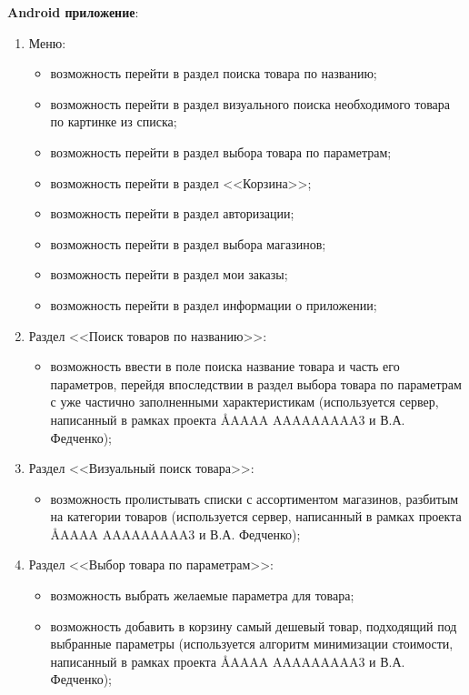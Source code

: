 \documentclass[a4paper,12pt,reqno]{article}
\begin{document}
  \noindent\textbf{Android приложение}:
  \begin{enumerate}
    \item Меню:
    \begin{itemize}
      \item возможность перейти в раздел поиска товара по названию;
      \item возможность перейти в раздел визуального поиска необходимого товара по картинке из списка;
      \item возможность перейти в раздел выбора товара по параметрам;
      \item возможность перейти в раздел <<Корзина>>;
      \item возможность перейти в раздел авторизации;
      \item возможность перейти в раздел выбора магазинов;
      \item возможность перейти в раздел мои заказы;
      \item возможность перейти в раздел информации о приложении;
    \end{itemize}
    \item Раздел <<Поиск товаров по названию>>:
    \begin{itemize}
      \item возможность ввести в поле поиска название товара и часть его параметров, перейдя впоследствии в раздел выбора товара по параметрам с уже частично заполненными характеристикам (используется сервер, написанный в рамках проекта \AA{AAAA AAAAAAAAA}{3} и В.А. Федченко);
    \end{itemize}
    \item Раздел <<Визуальный поиск товара>>:
    \begin{itemize}
      \item возможность пролистывать списки с ассортиментом магазинов, разбитым на категории товаров (используется сервер, написанный в рамках проекта \AA{AAAA AAAAAAAAA}{3} и В.А. Федченко);
    \end{itemize}
    \item Раздел <<Выбор товара по параметрам>>:
    \begin{itemize}
      \item возможность выбрать желаемые параметра для товара;
      \item возможность добавить в корзину самый дешевый товар, подходящий под выбранные параметры (используется алгоритм минимизации стоимости, написанный в рамках проекта \AA{AAAA AAAAAAAAA}{3} и В.А. Федченко);
    \end{itemize}

\end{enumerate}
\end{document}
